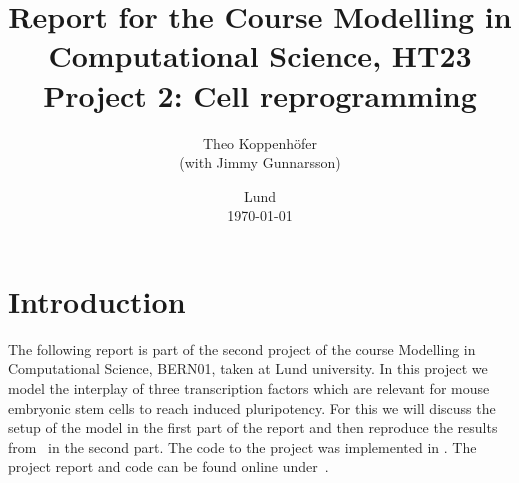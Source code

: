 





\title{ Report for the Course Modelling in Computational Science, HT23 \\[1ex]
	  \large Project 2: Cell reprogramming}
\author{Theo Koppenhöfer \\[1ex] (with Jimmy Gunnarsson)}
\date{Lund \\[1ex] \today}



\usepackage{pythonhighlight}
\usepackage{pgfplots}
\usepackage{caption}
\graphicspath{{../Plots/}}


\newcommand{\Nover}{N_\text{over}}
\newcommand{\Oover}{O_\text{over}}
\newcommand{\Tover}{T_\text{over}}
\newcommand{\Ntotal}{\text{N}}
\newcommand{\Ototal}{\text{O}}
\newcommand{\Ttotal}{\text{T}}
\newcommand{\NT}{\text{N-T}}
\newcommand{\LIF}{\text{LIF}}






\maketitle

\section{Introduction}
The following report is part of the second project of the course Modelling in Computational Science, BERN01, taken at Lund university.
In this project we model the interplay of three transcription factors which are relevant for mouse embryonic stem cells to reach induced
pluripotency.
For this we will discuss the setup of the model in the first part of the report and then reproduce the results from~\cite{Olariu2016} in the second part.
The code to the project was implemented in .
The project report and code can be found online under~\cite{Repository}.

